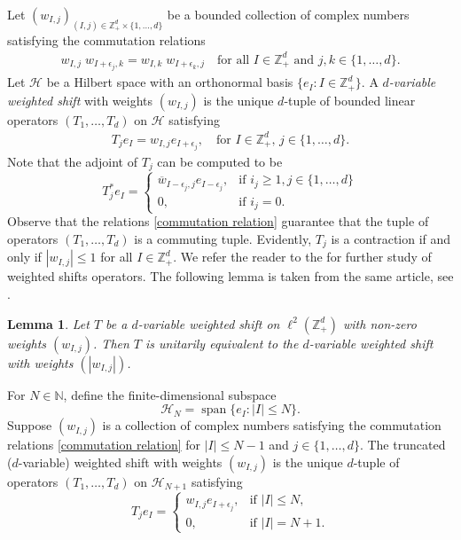 \documentclass[12pt,reqno] {amsart}
\newtheorem{lemma}{Lemma}
\theoremstyle{remark}
\theoremstyle{definition}
\begin{document}
Let $({w}_{I,j})_{(I,j) \in \mathbb{Z}_+^d \times \{1, \dots, d\}}$
be a bounded collection of complex numbers satisfying the commutation relations
\begin{eqnarray}\label{commutation relation}
    {w}_{I,j} \; {w}_{I+\epsilon_j ,k} = {w}_{I,k} \; {w}_{I+\epsilon_k ,j} \quad \text{for all } I \in \mathbb{Z}_+^d \text{ and } j,k \in \{1,\dots ,d\}.
\end{eqnarray}
Let \( \mathcal{H} \) be a Hilbert space with an orthonormal basis \( \{ e_I : I \in \mathbb{Z}_+^d \} \). A {\it $d$-variable weighted shift} with weights $({w}_{I,j})$ is the unique $d$-tuple of bounded linear operators \( (T_1 ,\dots ,T_d ) \) on \( \mathcal{H} \) satisfying
\begin{eqnarray*}
    T_j e_I = {w}_{I,j} e_{I+\epsilon_j}, \quad \text{for } I \in \mathbb{Z}_+^d, \, j \in \{1,\dots,d\}.
\end{eqnarray*}
Note that the adjoint of $T_j$ can be computed to be
\[
T_j^* e_I =
\begin{cases}
\overline{{w}}_{I-\epsilon_j,j} e_{I-\epsilon_j}, & \text{if } i_j \geq 1, j\in \{1,\dots,d\} \\
0, & \text{if } i_j = 0.
\end{cases}
\]
Observe that the relations \eqref{commutation relation} guarantee that the tuple of  operators \( (T_1,\ldots, T_d) \) is a commuting tuple.  Evidently, \( T_j \) is a contraction if and only if \( |{w}_{I,j}| \leq 1 \) for all \( I \in \mathbb{Z}_+^d \). We refer the reader to the \cite{J-L} for further study of weighted shifts operators. The following lemma is taken from the same article, see \cite[Corollary 2]{J-L}.
\begin{lemma}  
Let \( T \) be a \( d \)-variable  weighted shift on \( {\ell^2}(\mathbb{Z}_+^d) \) with non-zero weights \( (w_{I,j}) \). Then \( T \) is unitarily equivalent to the \( d \)-variable weighted shift with weights \( (|w_{I,j}|) \).
\end{lemma} 

For \( N \in \mathbb{N} \), define the finite-dimensional subspace
\[
\mathcal{H}_N = \operatorname{span} \{ e_I : |I| \leq N \}.
\]
Suppose \( (w_{I,j}) \) is a collection of complex numbers satisfying the commutation relations \eqref{commutation relation} for \( |I| \leq N - 1 \) and \( j \in \{1, \dots, d\} \). 
The truncated ($d$-variable) weighted shift with weights \( (w_{I,j}) \) is the unique $d$-tuple of operators \( (T_1, \dots, T_d) \) on \( \mathcal{H}_{N+1} \) satisfying
\[
T_j e_I =
\begin{cases}
{w}_{I,j} e_{I+\epsilon_j}, & \text{if } |I| \leq N, \\
0, & \text{if } |I| = N+1.
\end{cases}
\]
\end{document}
